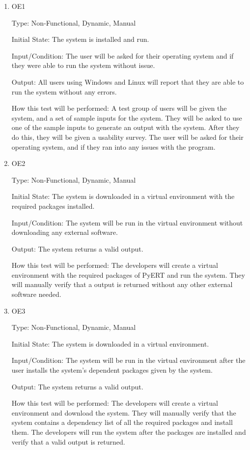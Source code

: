 \documentclass[12pt, titlepage]{article}
\begin{document}
\begin{enumerate}

\item{OE1\\}\label{OE1}

Type: Non-Functional, Dynamic, Manual
					
Initial State: 
The system is installed and run.

Input/Condition: 
The user will be asked for their operating system and if they were able to run the system without issue.

Output: 
All users using Windows and Linux will report that they are able to run the system without any errors.

How this test will be performed: 
A test group of users will be given the system, and a set of sample inputs for the system. They will be asked to use one of the sample inputs to generate an output with the system. After they do this, they will be given a usability survey. The user will be asked for their operating system, and if they ran into any issues with the program.
\\
\item{OE2\\}\label{OE2}

Type: Non-Functional, Dynamic, Manual
					
Initial State: 
The system is downloaded in a virtual environment with the required packages installed.

Input/Condition: 
The system will be run in the virtual environment without downloading any external software.

Output: 
The system returns a valid output.

How this test will be performed: 
The developers will create a virtual environment with the required packages of PyERT and run the system. They will manually verify that a output is returned without any other external software needed.
\\
\item{OE3\\}\label{OE3}

Type: Non-Functional, Dynamic, Manual
					
Initial State: 
The system is downloaded in a virtual environment.

Input/Condition: 
The system will be run in the virtual environment after the user installs the system's dependent packages given by the system.

Output: 
The system returns a valid output.

How this test will be performed: 
The developers will create a virtual environment and download the system. They will manually verify that the system contains a dependency list of all the required packages and install them. The developers will run the system after the packages are installed and verify that a valid output is returned.

\end{enumerate}
\end{document}
